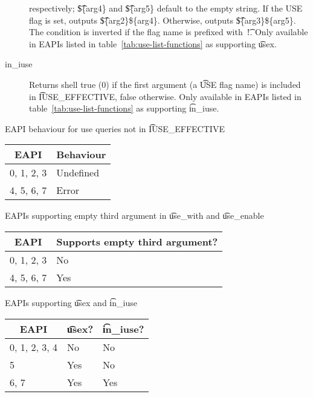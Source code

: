 \begin{description}
    respectively; \t{\$\{arg4\}} and \t{\$\{arg5\}} default to the empty string. If the USE flag is
    set, outputs \t{\$\{arg2\}\$\{arg4\}}. Otherwise, outputs \t{\$\{arg3\}\$\{arg5\}}.
    The condition is inverted if the flag name is prefixed with~\t{!}.
    Only available in EAPIs listed in table~\ref{tab:use-list-functions} as supporting \t{usex}.
\item[in_iuse]  Returns shell true (0) if the first argument (a \t{USE} flag
    name) is included in \t{IUSE_EFFECTIVE}, false otherwise. Only available in EAPIs listed in
    table~\ref{tab:use-list-functions} as supporting \t{in_iuse}.
\end{description}

\begin{centertable}{EAPI behaviour for use queries not in \t{IUSE_EFFECTIVE}}
    \label{tab:use-list-strictness}
    \begin{tabular}{ll}
      \toprule
      \multicolumn{1}{c}{\textbf{EAPI}} &
      \multicolumn{1}{c}{\textbf{Behaviour}} \\
      \midrule
      0, 1, 2, 3        & Undefined \\
      4, 5, 6, 7        & Error     \\
      \bottomrule
    \end{tabular}
\end{centertable}

\begin{centertable}{EAPIs supporting empty third argument in \t{use_with} and \t{use_enable}}
    \label{tab:use-with-third-arg}
    \begin{tabular}{ll}
      \toprule
      \multicolumn{1}{c}{\textbf{EAPI}} &
      \multicolumn{1}{c}{\textbf{Supports empty third argument?}} \\
      \midrule
      0, 1, 2, 3        & No  \\
      4, 5, 6, 7        & Yes \\
      \bottomrule
    \end{tabular}
\end{centertable}

\begin{centertable}{EAPIs supporting \t{usex} and \t{in_iuse}}
    \label{tab:use-list-functions}
    \begin{tabular}{lll}
      \toprule
      \multicolumn{1}{c}{\textbf{EAPI}} &
      \multicolumn{1}{c}{\textbf{\t{usex}?}} &
      \multicolumn{1}{c}{\textbf{\t{in_iuse}?}} \\
      \midrule
      0, 1, 2, 3, 4     & No  & No  \\
      5                 & Yes & No  \\
      6, 7              & Yes & Yes \\
      \bottomrule
    \end{tabular}
\end{centertable}

